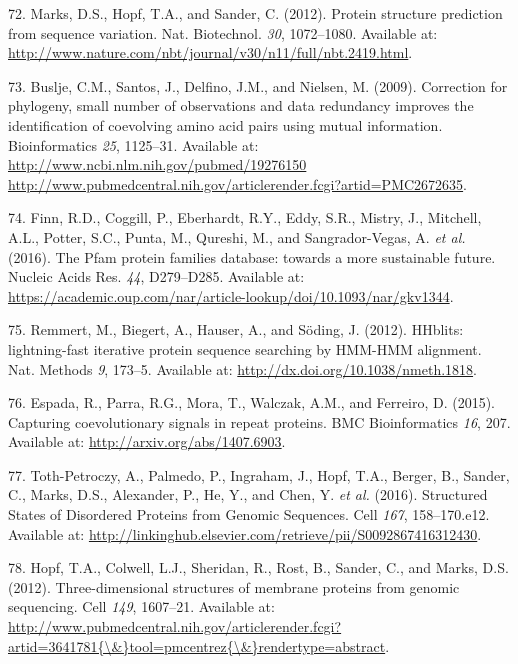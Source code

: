 \documentclass[12pt,a4paper,twoside]{book}
\theoremstyle{definition}
\theoremstyle{definition}
\theoremstyle{remark}
\begin{document}
\hypertarget{ref-Marks2012}{}
72. Marks, D.S., Hopf, T.A., and Sander, C. (2012). Protein structure
prediction from sequence variation. Nat. Biotechnol. \emph{30},
1072--1080. Available at:
\url{http://www.nature.com/nbt/journal/v30/n11/full/nbt.2419.html}.

\hypertarget{ref-Buslje2009}{}
73. Buslje, C.M., Santos, J., Delfino, J.M., and Nielsen, M. (2009).
Correction for phylogeny, small number of observations and data
redundancy improves the identification of coevolving amino acid pairs
using mutual information. Bioinformatics \emph{25}, 1125--31. Available
at:
\href{http://www.ncbi.nlm.nih.gov/pubmed/19276150\%20http://www.pubmedcentral.nih.gov/articlerender.fcgi?artid=PMC2672635}{http://www.ncbi.nlm.nih.gov/pubmed/19276150 http://www.pubmedcentral.nih.gov/articlerender.fcgi?artid=PMC2672635}.

\hypertarget{ref-Finn2016}{}
74. Finn, R.D., Coggill, P., Eberhardt, R.Y., Eddy, S.R., Mistry, J.,
Mitchell, A.L., Potter, S.C., Punta, M., Qureshi, M., and
Sangrador-Vegas, A. \emph{et al.} (2016). The Pfam protein families
database: towards a more sustainable future. Nucleic Acids Res.
\emph{44}, D279--D285. Available at:
\url{https://academic.oup.com/nar/article-lookup/doi/10.1093/nar/gkv1344}.

\hypertarget{ref-Remmert2012}{}
75. Remmert, M., Biegert, A., Hauser, A., and Söding, J. (2012).
HHblits: lightning-fast iterative protein sequence searching by HMM-HMM
alignment. Nat. Methods \emph{9}, 173--5. Available at:
\url{http://dx.doi.org/10.1038/nmeth.1818}.

\hypertarget{ref-Espada2014}{}
76. Espada, R., Parra, R.G., Mora, T., Walczak, A.M., and Ferreiro, D.
(2015). Capturing coevolutionary signals in repeat proteins. BMC
Bioinformatics \emph{16}, 207. Available at:
\url{http://arxiv.org/abs/1407.6903}.

\hypertarget{ref-Toth-Petroczy2016}{}
77. Toth-Petroczy, A., Palmedo, P., Ingraham, J., Hopf, T.A., Berger,
B., Sander, C., Marks, D.S., Alexander, P., He, Y., and Chen, Y.
\emph{et al.} (2016). Structured States of Disordered Proteins from
Genomic Sequences. Cell \emph{167}, 158--170.e12. Available at:
\url{http://linkinghub.elsevier.com/retrieve/pii/S0092867416312430}.

\hypertarget{ref-Hopf2012}{}
78. Hopf, T.A., Colwell, L.J., Sheridan, R., Rost, B., Sander, C., and
Marks, D.S. (2012). Three-dimensional structures of membrane proteins
from genomic sequencing. Cell \emph{149}, 1607--21. Available at:
\href{http://www.pubmedcentral.nih.gov/articlerender.fcgi?artid=3641781\%7B/\&\%7Dtool=pmcentrez\%7B/\&\%7Drendertype=abstract}{http://www.pubmedcentral.nih.gov/articlerender.fcgi?artid=3641781\{\textbackslash{}\&\}tool=pmcentrez\{\textbackslash{}\&\}rendertype=abstract}.
\end{document}
